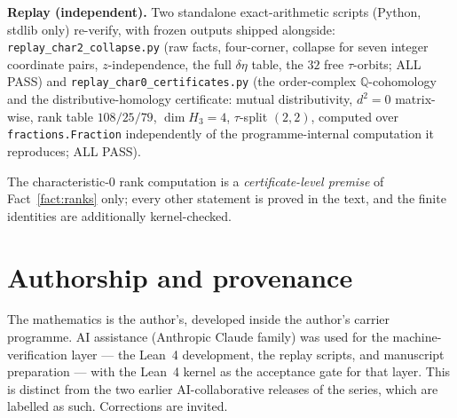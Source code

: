 \documentclass[11pt]{article}
\theoremstyle{definition}
\theoremstyle{remark}
\newcommand{\Q}{\mathbb{Q}}
\begin{document}
\textbf{Replay (independent).} Two standalone exact-arithmetic scripts (Python, stdlib only) re-verify, with frozen outputs shipped alongside: \texttt{replay\_char2\_collapse.py} (raw facts, four-corner, collapse for seven integer coordinate pairs, $z$-independence, the full $\delta\eta$ table, the $32$ free $\tau$-orbits; ALL PASS) and \texttt{replay\_char0\_certificates.py} (the order-complex $\Q$-cohomology and the distributive-homology certificate: mutual distributivity, $d^2=0$ matrix-wise, rank table $108/25/79$, $\dim H_3=4$, $\tau$-split $(2,2)$, computed over \texttt{fractions.Fraction} independently of the programme-internal computation it reproduces; ALL PASS).

The characteristic-$0$ rank computation is a \emph{certificate-level premise} of Fact~\ref{fact:ranks} only; every other statement is proved in the text, and the finite identities are additionally kernel-checked.

\section*{Authorship and provenance}

The mathematics is the author's, developed inside the author's carrier programme. AI assistance (Anthropic Claude family) was used for the machine-verification layer --- the Lean~4 development, the replay scripts, and manuscript preparation --- with the Lean~4 kernel as the acceptance gate for that layer. This is distinct from the two earlier AI-collaborative releases of the series, which are labelled as such. Corrections are invited.
\end{document}
